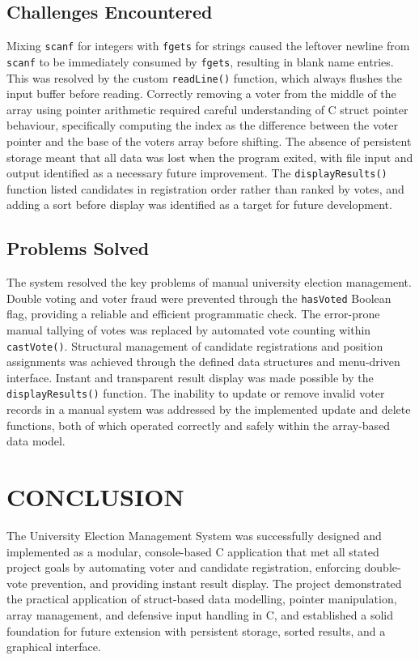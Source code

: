 \documentclass[12pt,a4paper]{article}
\begin{document}
\subsection{Challenges Encountered}

Mixing \texttt{scanf} for integers with \texttt{fgets} for strings caused the leftover newline from
\texttt{scanf} to be immediately consumed by \texttt{fgets}, resulting in blank name entries. This
was resolved by the custom \texttt{readLine()} function, which always flushes the input buffer
before reading. Correctly removing a voter from the middle of the array using pointer
arithmetic required careful understanding of C struct pointer behaviour, specifically
computing the index as the difference between the voter pointer and the base of the
voters array before shifting. The absence of persistent storage meant that all data was
lost when the program exited, with file input and output identified as a necessary
future improvement. The \texttt{displayResults()} function listed candidates in registration
order rather than ranked by votes, and adding a sort before display was identified as a
target for future development.

\subsection{Problems Solved}

The system resolved the key problems of manual university election management.
Double voting and voter fraud were prevented through the \texttt{hasVoted} Boolean flag,
providing a reliable and efficient programmatic check. The error-prone manual tallying
of votes was replaced by automated vote counting within \texttt{castVote()}. Structural
management of candidate registrations and position assignments was achieved through
the defined data structures and menu-driven interface. Instant and transparent result
display was made possible by the \texttt{displayResults()} function. The inability to update
or remove invalid voter records in a manual system was addressed by the implemented
update and delete functions, both of which operated correctly and safely within the
array-based data model.

\newpage
\section{CONCLUSION}

The University Election Management System was successfully designed and implemented
as a modular, console-based C application that met all stated project goals by
automating voter and candidate registration, enforcing double-vote prevention, and
providing instant result display. The project demonstrated the practical application of
struct-based data modelling, pointer manipulation, array management, and defensive
input handling in C, and established a solid foundation for future extension with
persistent storage, sorted results, and a graphical interface.
\end{document}
